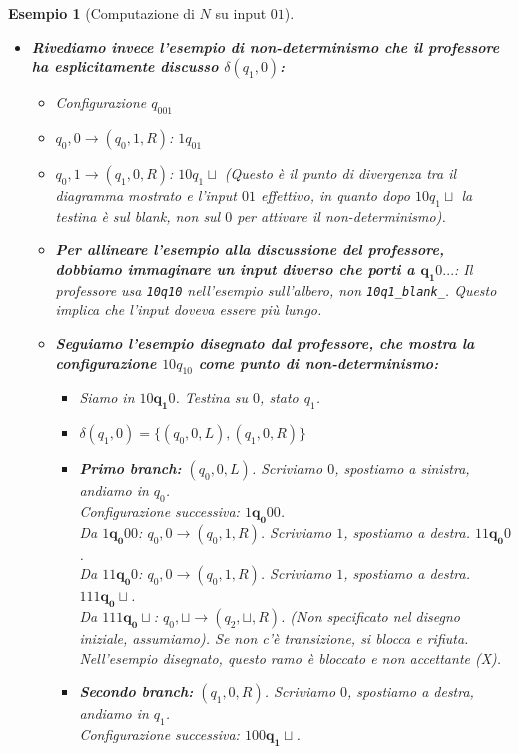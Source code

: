 \documentclass[a4paper]{article}
\newtheorem{example}{Esempio}
\begin{document}
\begin{example}[Computazione di $N$ su input $01$]
\begin{enumerate}
\begin{itemize}
        \item \textbf{Rivediamo invece l'esempio di non-determinismo che il professore ha esplicitamente discusso $\delta(q_1,0)$:}
        \begin{itemize}
            \item Configurazione $q_001$
            \item $q_0,0 \to (q_0,1,R)$: $1q_01$
            \item $q_0,1 \to (q_1,0,R)$: $10q_1\sqcup$ (Questo è il punto di divergenza tra il diagramma mostrato e l'input $01$ effettivo, in quanto dopo $10q_1\sqcup$ la testina è sul blank, non sul $0$ per attivare il non-determinismo).
            \item \textbf{Per allineare l'esempio alla discussione del professore, dobbiamo immaginare un input diverso che porti a $\mathbf{q_1}0...$}: Il professore usa \texttt{10q10} nell'esempio sull'albero, non \texttt{10q1\_blank\_}. Questo implica che l'input doveva essere più lungo.
            \item \textbf{Seguiamo l'esempio disegnato dal professore, che mostra la configurazione $10q_10$ come punto di non-determinismo:}
            \begin{itemize}
                \item Siamo in $10\mathbf{q_1}0$. Testina su $0$, stato $q_1$.
                \item $\delta(q_1, 0) = \{ (q_0, 0, L), (q_1, 0, R) \}$
                \item \textbf{Primo branch:} $(q_0, 0, L)$. Scriviamo $0$, spostiamo a sinistra, andiamo in $q_0$.\\
                Configurazione successiva: $1\mathbf{q_0}00$.\\
                Da $1\mathbf{q_0}00$: $q_0,0 \to (q_0,1,R)$. Scriviamo $1$, spostiamo a destra. $11\mathbf{q_0}0$.\\
                Da $11\mathbf{q_0}0$: $q_0,0 \to (q_0,1,R)$. Scriviamo $1$, spostiamo a destra. $111\mathbf{q_0}\sqcup$.\\
                Da $111\mathbf{q_0}\sqcup$: $q_0,\sqcup \to (q_2,\sqcup,R)$. (Non specificato nel disegno iniziale, assumiamo). Se non c'è transizione, si blocca e rifiuta. Nell'esempio disegnato, questo ramo è bloccato e non accettante (X).
                \item \textbf{Secondo branch:} $(q_1, 0, R)$. Scriviamo $0$, spostiamo a destra, andiamo in $q_1$.\\
                Configurazione successiva: $100\mathbf{q_1}\sqcup$.\\

\end{itemize}
\end{itemize}
\end{itemize}
\end{enumerate}
\end{example}
\end{document}

